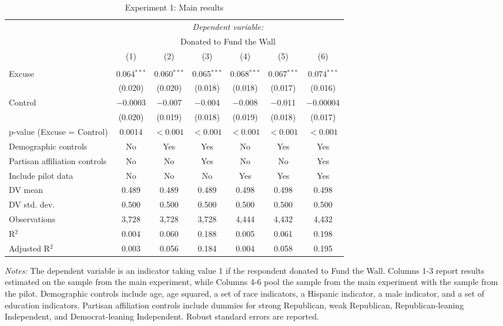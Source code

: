 
\begin{table}[!htbp] \centering 
  \caption{Experiment 1: Main results} 
  \label{t:2-main} 
\begin{threeparttable}
\begin{tabular}{@{\hspace{5pt}}l@{\hspace{5pt}}cccccc} 
\toprule 
 & \multicolumn{6}{c}{\textit{Dependent variable:}} \\ 
\cmidrule(rr){2-7} 
 & \multicolumn{6}{c}{Donated to Fund the Wall} \\ 
 \cmidrule(rr){2-7}
 & (1) & (2) & (3) & (4) & (5) & (6)\\ 
\midrule  
\\[-2.1ex] Excuse & 0.064$^{***}$ & 0.060$^{***}$ & 0.065$^{***}$ & 0.068$^{***}$ & 0.067$^{***}$ & 0.074$^{***}$ \\ 
  & (0.020) & (0.020) & (0.018) & (0.018) & (0.017) & (0.016) \\ 
 \addlinespace 
 Control & $-$0.0003 & $-$0.007 & $-$0.004 & $-$0.008 & $-$0.011 & $-$0.00004 \\ 
  & (0.020) & (0.019) & (0.018) & (0.019) & (0.018) & (0.017) \\ 
 \addlinespace 
p-value (Excuse = Control) & 0.0014 & $<0.001$ & $<0.001$ & $<0.001$ & $<0.001$ & $<0.001$ \\ 
\midrule  
Demographic controls & No & Yes & Yes & No & Yes & Yes \\ 
Partisan affiliation controls & No & No & Yes & No & No & Yes \\ 
\midrule
Include pilot data & No & No & No & Yes & Yes & Yes \\
\addlinespace
DV mean & 0.489 & 0.489 & 0.489 & 0.498 & 0.498 & 0.498 \\
DV std. dev. & 0.500 & 0.500 & 0.500 & 0.500 & 0.500 & 0.500 \\
Observations & 3,728 & 3,728 & 3,728 & 4,444 & 4,432 & 4,432 \\ 
R$^{2}$ & 0.004 & 0.060 & 0.188 & 0.005 & 0.061 & 0.198 \\ 
Adjusted R$^{2}$ & 0.003 & 0.056 & 0.184 & 0.004 & 0.058 & 0.195 \\ 
\bottomrule 
\end{tabular} 
\begin{tablenotes}
\footnotesize
\item \textit{Notes:} The dependent variable is an indicator taking value 1 if the respondent donated to Fund the Wall. Columns 1-3 report results estimated on the sample from the main experiment, while Columns 4-6 pool the sample from the main experiment with the sample from the pilot. Demographic controls include age, age squared, a set of race indicators, a Hispanic indicator, a male indicator, and a set of education indicators. Partisan affiliation controls include dummies for strong Republican, weak Republican, Republican-leaning Independent, and Democrat-leaning Independent. Robust standard errors are reported.
\end{tablenotes}
\end{threeparttable}
\end{table} 
